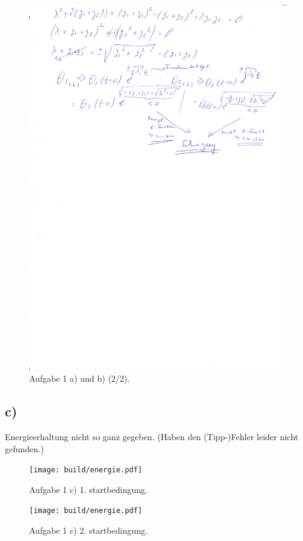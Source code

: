 \begin{figure}
  \includegraphics[width=\textwidth]{cp_8_12.jpg}
  \caption{Aufgabe 1 a) und b) (2/2).}
  \label{fig:bild2}
\end{figure}

\FloatBarrier
\subsection*{c)}

Energieerhaltung nicht so ganz gegeben.
(Haben den (Tipp-)Fehler leider nicht gefunden.)

\begin{figure}
  \texttt{[image: build/energie.pdf]}
  \caption{Aufgabe 1 c) 1. startbedingung.}
  \label{fig:bild3}
\end{figure}

\begin{figure}
  \texttt{[image: build/energie.pdf]}
  \caption{Aufgabe 1 c) 2. startbedingung.}
  \label{fig:bild4}
\end{figure}


